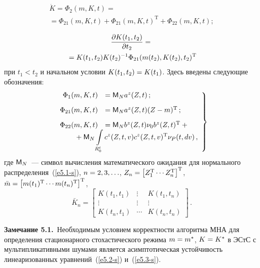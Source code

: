 \begin{multicols}{2}
\vspace*{-12pt}

\noindent
\begin{multline}
\dot K =\Phi_2 (m,K,t) ={}\\
\!\!{}= \Phi_{21} (m,K,t) +\Phi_{21} (m,K,t)^{\mathrm{T}} 
+\Phi_{22} (m,K,t);\!\!\label{e5.3-s}
\end{multline}

\vspace*{-12pt}

\noindent
\begin{multline*}
\displaystyle\frac{\displaystyle \partial K(t_1, t_2)\mathstrut}{\displaystyle \partial t_2\mathstrut} ={}\\
{}= K(t_1, t_2) K(t_2)^{-1} \Phi_{21} (m(t_2), K(t_2), t_2)^{\mathrm{T}}
\end{multline*}
при $t_1<t_2$ и начальном условии $K(t_1, t_2)\hm = K(t_1)$.
Здесь введены следующие обозначения:
\begin{equation}
\left.
\begin{array}{rl}
\Phi_1 (m,K,t)&= {\sf M}_N a^z (Z,t)\,;\\[9pt]
\Phi_{21}(m,K,t)&= {\sf M}_N a^z (Z,t) (Z-m)^{\mathrm{T}}\,;\\[9pt]
\Phi_{22}(m,K,t) &= {\sf M}_N b^z (Z,t) \nu_0 b^z (Z,t)^{\mathrm{T}} + {}\\
&\hspace*{-15mm}\displaystyle{}+{\sf M}_N  \iii_{R_0^t} c^z (Z, t,v) c^z(Z,t,v)^{\mathrm{T}} \nu_P (t, dv)\,,
\end{array}
\right\}
\label{e5.5-s}
\end{equation}
где ${\sf M}_N$~--- символ вычисления математического ожидания для нормального 
распределения~(\ref{e5.1-s}), $n\hm=2,3,\ldots$, 
$Z_n \hm= \lk Z_1^{\mathrm{T}} \cdots Z_n^{\mathrm{T}}\rk^{\mathrm{T}}$, 
$ \bar m \hm=\lk m(t_1)^{\mathrm{T}}\cdots m(t_n)^{\mathrm{T}}\rk^{\mathrm{T}}$,
    $$\bar K_n =\begin{bmatrix}
    K(t_1, t_1)&\vdots&K(t_1, t_n)\\
    \vdots&\vdots&\vdots\\
    K(t_n, t_1)&\cdots&K(t_n, t_n)\end{bmatrix}\,.
    $$

\noindent
\textbf{Замечание 5.1.}\
Необходимым условием кор\-рект\-ности алгоритма МНА для определения стационарного 
стохастического режима  $m\hm=m^*$, $K\hm=K^*$  в ЭСтС с мультипликативными шумами 
является асимптотическая устойчивость линеаризованных уравнений~(\ref{e5.2-s}) 
и~(\ref{e5.3-s}).


\end{multicols}
